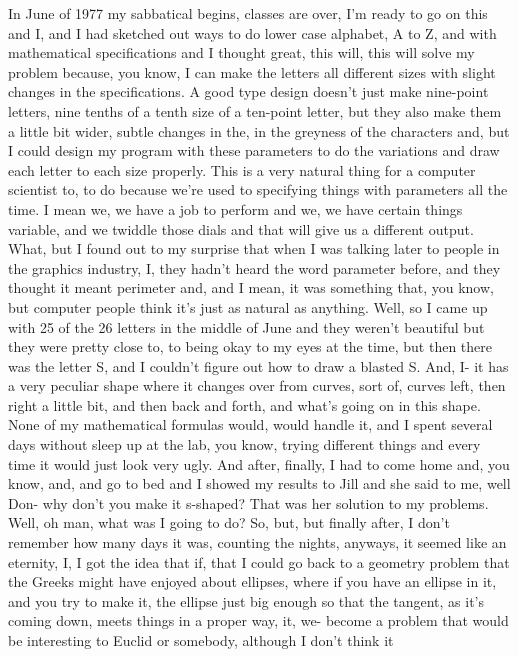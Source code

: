 \documentclass[]{article}
\begin{document}
In June of 1977 my sabbatical begins, classes are over, I'm ready to go
on this and I, and I had sketched out ways to do lower case alphabet, A
to Z, and with mathematical specifications and I thought great, this
will, this will solve my problem because, you know, I can make the
letters all different sizes with slight changes in the specifications. A
good type design doesn't just make nine-point letters, nine tenths of a
tenth size of a ten-point letter, but they also make them a little bit
wider, subtle changes in the, in the greyness of the characters and, but
I could design my program with these parameters to do the variations and
draw each letter to each size properly. This is a very natural thing for
a computer scientist to, to do because we're used to specifying things
with parameters all the time. I mean we, we have a job to perform and
we, we have certain things variable, and we twiddle those dials and that
will give us a different output. What, but I found out to my surprise
that when I was talking later to people in the graphics industry, I,
they hadn't heard the word parameter before, and they thought it meant
perimeter and, and I mean, it was something that, you know, but computer
people think it's just as natural as anything. Well, so I came up with
25 of the 26 letters in the middle of June and they weren't beautiful
but they were pretty close to, to being okay to my eyes at the time, but
then there was the letter S, and I couldn't figure out how to draw a
blasted S. And, I- it has a very peculiar shape where it changes over
from curves, sort of, curves left, then right a little bit, and then
back and forth, and what's going on in this shape. None of my
mathematical formulas would, would handle it, and I spent several days
without sleep up at the lab, you know, trying different things and every
time it would just look very ugly. And after, finally, I had to come
home and, you know, and, and go to bed and I showed my results to Jill
and she said to me, well Don- why don't you make it s-shaped? That was
her solution to my problems. Well, oh man, what was I going to do? So,
but, but finally after, I don't remember how many days it was, counting
the nights, anyways, it seemed like an eternity, I, I got the idea that
if, that I could go back to a geometry problem that the Greeks might
have enjoyed about ellipses, where if you have an ellipse in it, and you
try to make it, the ellipse just big enough so that the tangent, as it's
coming down, meets things in a proper way, it, we- become a problem that
would be interesting to Euclid or somebody, although I don't think it
\end{document}
